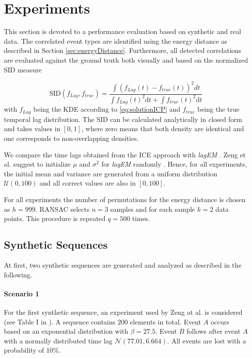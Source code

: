 \documentclass[conference]{IEEEtran}
\theoremstyle{examplestyle}
\begin{document}
\section{Experiments} \label{sec:exp}
This section is devoted to a performance evaluation based on synthetic and real data.
The correlated event types are identified using the energy distance as described in Section \ref{sec:energyDistance}.
Furthermore, all detected correlations are evaluated against the ground truth both visually and based on the normalized \ac{SID} measure \cite{Hanebeck2003}

\begin{equation}
	\text{SID}(f_{Lag}, f_{true}) = \frac{\int \left( f_{Lag} (t) - f_{true}(t) \right)^2 d t}{\int f_{Lag} (t)^2 \text{d} t + \int f_{true}(t)^2 \text{d} t}
\end{equation}
with $f_{Lag}$ being the KDE according to \eqref{eq:solutionICP} and $f_{true}$ being the true temporal lag distribution. The SID can be calculated analytically in closed form and takes values in $[0,1]$, where zero means that both density are identical and one corresponds to non-overlapping densities.


We compare the time lags obtained from the \ac{ICE} approach with \textit{lagEM} \cite{Zeng2015}.
Zeng et al. suggest to initialize \(\mu\) and \(\sigma^2\) for \textit{lagEM} randomly \cite{Zeng2015}. Hence, for all experiments, the initial mean and variance are generated from a uniform distribution \(\mathcal{U}(0, 100)\) and all correct values are also in \([0, 100]\).


For all experiments the number of permutations for the energy distance is chosen as \(h = 999\). \ac{RANSAC} selects \(n = 3\) samples and for each sample \(k = 2\) data points. This procedure is repeated \(q = 500\) times.



\subsection{Synthetic Sequences}
At first, two synthetic sequences are generated and analyzed as described in the following.
\paragraph{Scenario 1}
For the first synthetic sequence, an experiment used by Zeng at al. is considered (see Table I in \cite{Zeng2015}). A sequence contains $200$ elements in total. Event \(A\) occurs based on an exponential distribution with \(\beta = 27.5\). Event \(B\) follows after event \(A\) with a normally distributed time lag \(\mathcal{N}(77.01, 6.664)\). All events are lost with a probability of 10\%.
\end{document}

